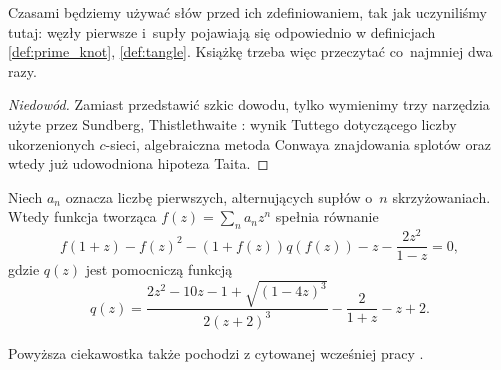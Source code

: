 Czasami będziemy używać słów przed ich zdefiniowaniem, tak jak uczyniliśmy tutaj: węzły pierwsze i~supły pojawiają się odpowiednio w definicjach \ref{def:prime_knot}, \ref{def:tangle}.
Książkę trzeba więc przeczytać co~najmniej dwa razy.

\begin{proof}[Niedowód]
%
%
    Zamiast przedstawić szkic dowodu, tylko wymienimy trzy narzędzia użyte przez Sundberg, Thistlethwaite \cite{sundberg1998}: wynik Tuttego dotyczącego liczby ukorzenionych $c$-sieci, algebraiczna metoda Conwaya znajdowania splotów oraz wtedy już udowodniona hipoteza Taita.
%
%
%
\end{proof}

\begin{proposition}
    Niech $a_n$ oznacza liczbę pierwszych, alternujących supłów o~$n$ skrzyżowaniach.
    Wtedy funkcja tworząca $f(z) = \sum_n a_n z^n$ spełnia równanie
    \begin{equation}
    f(1+z) - f(z)^2 - (1+f(z))q(f(z)) -z - \frac{2z^2}{1-z} = 0,
    \end{equation}
    gdzie $q(z)$ jest pomocniczą funkcją
    \begin{equation}
        q(z) = \frac{2z^2 - 10z - 1 + \sqrt{(1-4z)^3}} {2(z+2)^3} - \frac{2}{1+z} -z + 2.
    \end{equation}
\end{proposition}

Powyższa ciekawostka także pochodzi z cytowanej wcześniej pracy \cite{sundberg1998}.

